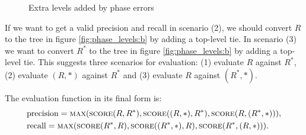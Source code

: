 \begin{figure}
\caption{Extra levels added by phase errors}
\label{fig:phase_levels}
\end{figure}

If we want to get a valid precision and recall in scenario (2), we should convert $R$ to the tree in figure \ref{fig:phase_levels:b} by adding a top-level tie. In scenario (3) we want to convert $R^*$ to the tree in figure \ref{fig:phase_levels:b} by adding a top-level tie. This suggests three scenarios for evaluation: (1) evaluate $R$ against $R^*$, (2) evaluate $(R, *)$ against $R^*$ and (3) evaluate $R$ against $(R^*, *)$. 

The evaluation function in its final form is:
\begin{align}
\label{eq:evaluation}
&\mathrm{precision} = \textsc{max}(\textsc{score}(R, R^*), \textsc{score}((R, *), R^*), \textsc{score}(R, (R^*, *))),\\
&\mathrm{recall} = \textsc{max}(\textsc{score}(R^*, R), \textsc{score}((R^*, *), R), \textsc{score}(R^*, (R, *))).
\end{align}





